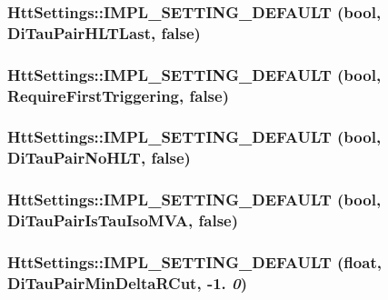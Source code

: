 \hypertarget{classHttSettings_adac071f81d9bd3aa4c7269b9e5f12276}{
\subsubsection[{IMPL\_\-SETTING\_\-DEFAULT}]{\setlength{\rightskip}{0pt plus 5cm}HttSettings::IMPL\_\-SETTING\_\-DEFAULT (bool, \/  DiTauPairHLTLast, \/  false)}}
\label{classHttSettings_adac071f81d9bd3aa4c7269b9e5f12276}
\hypertarget{classHttSettings_ae0424bba45f16e9ee28b093ee6cf26eb}{
\subsubsection[{IMPL\_\-SETTING\_\-DEFAULT}]{\setlength{\rightskip}{0pt plus 5cm}HttSettings::IMPL\_\-SETTING\_\-DEFAULT (bool, \/  RequireFirstTriggering, \/  false)}}
\label{classHttSettings_ae0424bba45f16e9ee28b093ee6cf26eb}
\hypertarget{classHttSettings_a3460424a36d89e264f3636661324bb24}{
\subsubsection[{IMPL\_\-SETTING\_\-DEFAULT}]{\setlength{\rightskip}{0pt plus 5cm}HttSettings::IMPL\_\-SETTING\_\-DEFAULT (bool, \/  DiTauPairNoHLT, \/  false)}}
\label{classHttSettings_a3460424a36d89e264f3636661324bb24}
\hypertarget{classHttSettings_a628ac5fc04df1c3f59616431a6401868}{
\subsubsection[{IMPL\_\-SETTING\_\-DEFAULT}]{\setlength{\rightskip}{0pt plus 5cm}HttSettings::IMPL\_\-SETTING\_\-DEFAULT (bool, \/  DiTauPairIsTauIsoMVA, \/  false)}}
\label{classHttSettings_a628ac5fc04df1c3f59616431a6401868}
\hypertarget{classHttSettings_a3a66cee45e0ac72fda735e26fa63fe76}{
\subsubsection[{IMPL\_\-SETTING\_\-DEFAULT}]{\setlength{\rightskip}{0pt plus 5cm}HttSettings::IMPL\_\-SETTING\_\-DEFAULT (float, \/  DiTauPairMinDeltaRCut, \/  -\/1. {\em 0})}}
